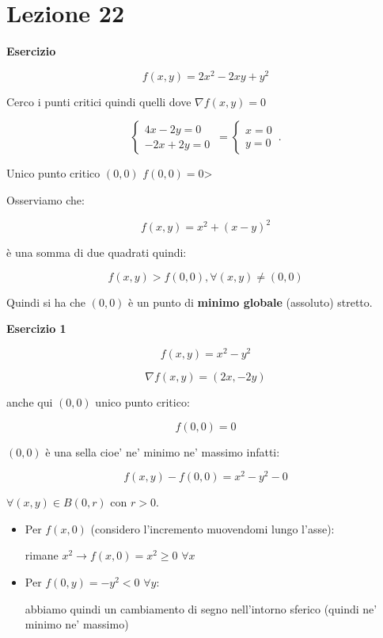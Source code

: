\documentclass[../appunti-analisi.tex]{subfiles}
\begin{document}
\section{Lezione 22}

\textbf{Esercizio}

\[
    f(x,y) = 2x^{2} - 2xy +y^{2}
\]

Cerco i punti critici quindi quelli dove $\nabla f(x,y) = 0$

\[
    \begin{cases}
           4x -2y = 0\\
           -2x +2y = 0
    \end{cases}\, =
    \begin{cases}
           x= 0\\
           y = 0
    \end{cases}\,.
\]

Unico punto critico $(0,0)$ $f(0,0)=0$>

Osserviamo che:

\[
    f(x,y) = x^{2} + (x-y)^{2}
\]

è una somma di due quadrati quindi:

\[
    f(x,y) > f(0,0),\forall (x,y) \neq (0,0)
\]

Quindi si ha che $(0,0)$ è  un punto di \textbf{minimo globale} (assoluto) stretto.


\textbf{Esercizio 1} 

\[
    f(x,y) = x^{2}-y^{2}
\]

\[
    \nabla f(x,y) = (2x, -2y)
\]

anche qui $(0,0)$ unico punto critico:

\[
    f(0,0) = 0
\]

$(0,0)$ è una sella cioe' ne' minimo ne' massimo infatti:

\[
    f(x,y) - f(0,0) = x^{2}-y^{2}-0
\]

$\forall (x,y) \in B(0,r)$ con $r>0$.

\begin{itemize}
    \item Per $f(x,0)$ (considero l'incremento muovendomi lungo l'asse):

        rimane $x^{2} \rightarrow  f(x,0)=x^{2}\ge 0$ $\forall x$
    \item Per $f(0,y) = -y^{2} <0$ $\forall y$:

        abbiamo quindi un cambiamento di segno nell'intorno sferico (quindi ne' minimo ne' massimo)
\end{itemize}
\end{document}
